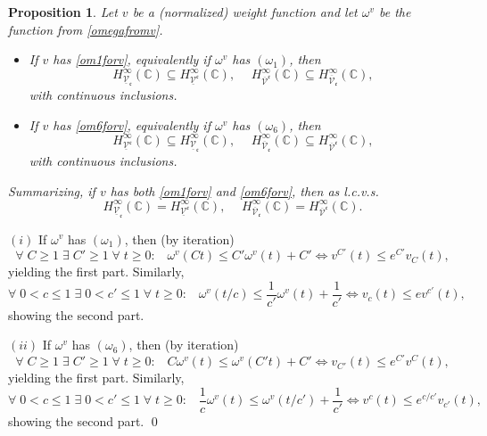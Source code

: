 \documentclass[10pt]{amsart}%
\numberwithin{equation}{section}
\theoremstyle{plain}
\newtheorem{proposition}{Proposition}[section]
\newcommand{\CC}{\mathbb{C}}
\begin{document}
\begin{proposition}\label{secondweighfctprop}
Let $v$ be a (normalized) weight function and let $\omega^v$ be the function from \eqref{omegafromv}.
\begin{itemize}
\item[$(i)$] If $v$ has \eqref{om1forv}, equivalently if $\omega^v$ has \hyperlink{om1}{$(\omega_1)$}, then
$$H^{\infty}_{\underline{\mathcal{V}}_{\mathfrak{c}}}(\CC)\subseteq H^{\infty}_{\underline{\mathcal{V}}^{\mathfrak{c}}}(\CC),\hspace{15pt}H^{\infty}_{\overline{\mathcal{V}}^{\mathfrak{c}}}(\CC)\subseteq H^{\infty}_{\overline{\mathcal{V}}_{\mathfrak{c}}}(\CC),$$
with continuous inclusions.

\item[$(ii)$] If $v$ has \eqref{om6forv}, equivalently if $\omega^v$ has \hyperlink{om6}{$(\omega_6)$}, then
$$H^{\infty}_{\underline{\mathcal{V}}^{\mathfrak{c}}}(\CC)\subseteq H^{\infty}_{\underline{\mathcal{V}}_{\mathfrak{c}}}(\CC),\hspace{15pt}H^{\infty}_{\overline{\mathcal{V}}_{\mathfrak{c}}}(\CC)\subseteq H^{\infty}_{\overline{\mathcal{V}}^{\mathfrak{c}}}(\CC),$$
with continuous inclusions.
\end{itemize}
Summarizing, if $v$ has both \eqref{om1forv} and \eqref{om6forv}, then as l.c.v.s.
$$H^{\infty}_{\underline{\mathcal{V}}_{\mathfrak{c}}}(\CC)=H^{\infty}_{\underline{\mathcal{V}}^{\mathfrak{c}}}(\CC),\hspace{15pt}H^{\infty}_{\overline{\mathcal{V}}_{\mathfrak{c}}}(\CC)=H^{\infty}_{\overline{\mathcal{V}}^{\mathfrak{c}}}(\CC).$$
\end{proposition}

$(i)$ If $\omega^v$ has \hyperlink{om1}{$(\omega_1)$}, then (by iteration)
$$\forall\;C\ge 1\;\exists\;C'\ge 1\;\forall\;t\ge 0:\;\;\;\omega^v(Ct)\le C'\omega^v(t)+C'\Leftrightarrow v^{C'}(t)\le e^{C'}v_C(t),$$
yielding the first part. Similarly,
$$\forall\;0<c\le 1\;\exists\;0<c'\le 1\;\forall\;t\ge 0:\;\;\;\omega^v(t/c)\le\frac{1}{c'}\omega^v(t)+\frac{1}{c'}\Leftrightarrow v_c(t)\le ev^{c'}(t),$$
showing the second part.\vspace{6pt}

$(ii)$ If $\omega^v$ has \hyperlink{om6}{$(\omega_6)$}, then (by iteration)
$$\forall\;C\ge 1\;\exists\;C'\ge 1\;\forall\;t\ge 0:\;\;\;C\omega^v(t)\le\omega^v(C't)+C'\Leftrightarrow v_{C'}(t)\le e^{C'}v^C(t),$$
yielding the first part. Similarly,
$$\forall\;0<c\le 1\;\exists\;0<c'\le 1\;\forall\;t\ge 0:\;\;\;\frac{1}{c}\omega^v(t)\le\omega^v(t/c')+\frac{1}{c'}\Leftrightarrow v^c(t)\le e^{c/c'}v_{c'}(t),$$
showing the second part.
\qed\enddemo
\end{document}
